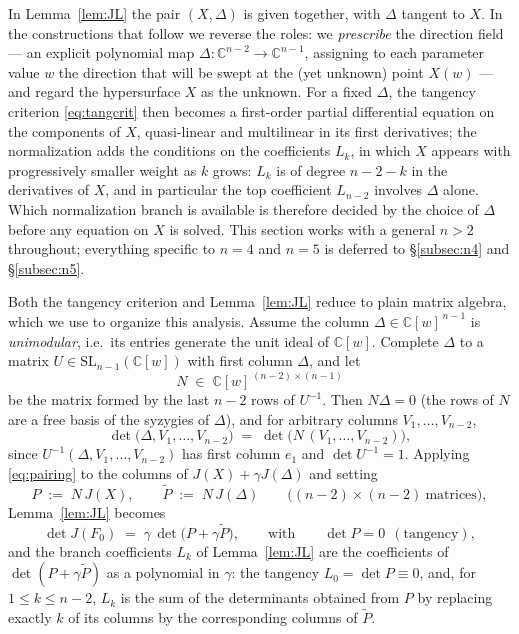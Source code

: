 \documentclass[11pt]{article}
\theoremstyle{plain}
\theoremstyle{definition}
\theoremstyle{remark}
\newcommand{\C}{\mathbb{C}}
\begin{document}
In Lemma~\ref{lem:JL} the pair $(X,\Delta)$ is given together, with $\Delta$
tangent to $X$. In the constructions that follow we reverse the roles: we
\emph{prescribe} the direction field --- an explicit polynomial map
$\Delta\colon\C^{n-2}\to\C^{n-1}$, assigning to each parameter value $w$ the
direction that will be swept at the (yet unknown) point $X(w)$ --- and regard
the hypersurface $X$ as the unknown. For a fixed $\Delta$, the tangency
criterion \eqref{eq:tangcrit} then becomes a first-order partial differential
equation on the components of $X$, quasi-linear and multilinear in its first
derivatives; the normalization
adds the conditions on the coefficients $L_k$, in which $X$ appears with
progressively smaller weight as $k$ grows: $L_k$ is of degree $n-2-k$ in the
derivatives of $X$, and in particular the top coefficient $L_{n-2}$ involves
$\Delta$ alone. Which normalization branch is available is therefore decided by
the choice of $\Delta$ before any equation on $X$ is solved. This section works
with a general $n>2$ throughout; everything specific to $n=4$ and $n=5$ is
deferred to \S\ref{subsec:n4} and \S\ref{subsec:n5}.

Both the tangency criterion and Lemma~\ref{lem:JL} reduce to plain matrix
algebra, which we use to organize this analysis. Assume the column
$\Delta\in\C[w]^{\,n-1}$ is \emph{unimodular}, i.e.\ its entries generate the
unit ideal of $\C[w]$. Complete $\Delta$ to a matrix
$U\in\mathrm{SL}_{n-1}(\C[w])$ with first column $\Delta$, and let
\[
N\;\in\;\C[w]^{\,(n-2)\times(n-1)}
\]
be the matrix formed by the last $n-2$ rows of $U^{-1}$. Then $N\Delta=0$ (the
rows of $N$ are a free basis of the syzygies of $\Delta$), and for arbitrary
columns $V_1,\dots,V_{n-2}$,
\begin{equation}\label{eq:pairing}
\det\bigl(\Delta,V_1,\dots,V_{n-2}\bigr)
\;=\;\det\bigl(N\,(V_1,\dots,V_{n-2})\bigr),
\end{equation}
since $U^{-1}(\Delta,V_1,\dots,V_{n-2})$ has first column $e_1$ and
$\det U^{-1}=1$. Applying \eqref{eq:pairing} to the columns of
$J(X)+\gamma J(\Delta)$ and setting
\[
P\;:=\;N\,J(X),\qquad
\widetilde P\;:=\;N\,J(\Delta)
\qquad\bigl((n-2)\times(n-2)\ \text{matrices}\bigr),
\]
Lemma~\ref{lem:JL} becomes
\begin{equation}\label{eq:wedge}
\det J(F_0)\;=\;\gamma\,\det\bigl(P+\gamma\widetilde P\bigr),
\qquad\text{with}\qquad
\det P=0\ \ (\text{tangency}),
\end{equation}
and the branch coefficients $L_k$ of Lemma~\ref{lem:JL} are the coefficients of
$\det(P+\gamma\widetilde P)$ as a polynomial in $\gamma$: the tangency
$L_0=\det P\equiv0$, and, for $1\le k\le n-2$, $L_k$ is the sum of the
determinants obtained from $P$ by replacing exactly $k$ of its columns by the
corresponding columns of $\widetilde P$.
\end{document}
